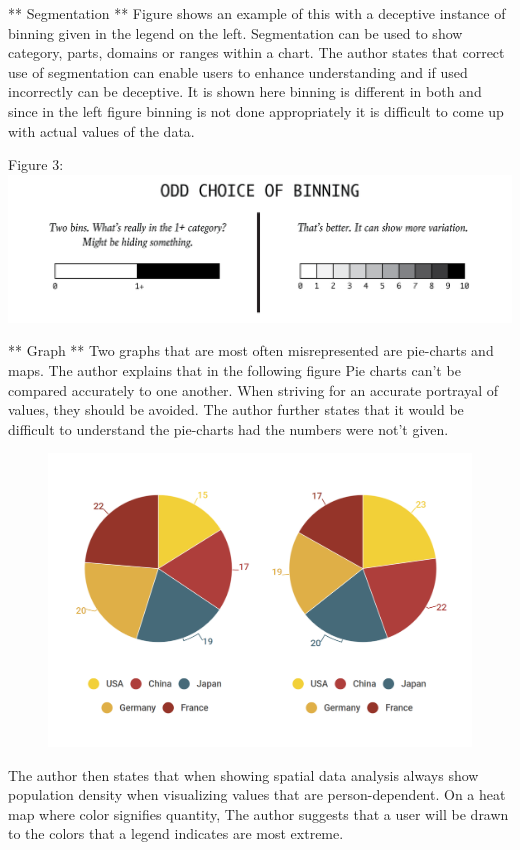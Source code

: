 \documentclass[]{book}
\theoremstyle{definition}
\theoremstyle{definition}
\theoremstyle{definition}
\theoremstyle{remark}
\begin{document}
** Segmentation ** Figure shows an example of this with a deceptive
instance of binning given in the legend on the left. Segmentation can be
used to show category, parts, domains or ranges within a chart. The
author states that correct use of segmentation can enable users to
enhance understanding and if used incorrectly can be deceptive. It is
shown here binning is different in both and since in the left figure
binning is not done appropriately it is difficult to come up with actual
values of the data.

Figure 3: \includegraphics{images/Segmentation 1.png}

** Graph ** Two graphs that are most often misrepresented are pie-charts
and maps. The author explains that in the following figure Pie charts
can't be compared accurately to one another. When striving for an
accurate portrayal of values, they should be avoided. The author further
states that it would be difficult to understand the pie-charts had the
numbers were not't given.

\begin{figure}
\centering
\includegraphics{images/PieCharts.png}
\caption{}
\end{figure}

The author then states that when showing spatial data analysis always
show population density when visualizing values that are
person-dependent. On a heat map where color signifies quantity, The
author suggests that a user will be drawn to the colors that a legend
indicates are most extreme.
\end{document}
